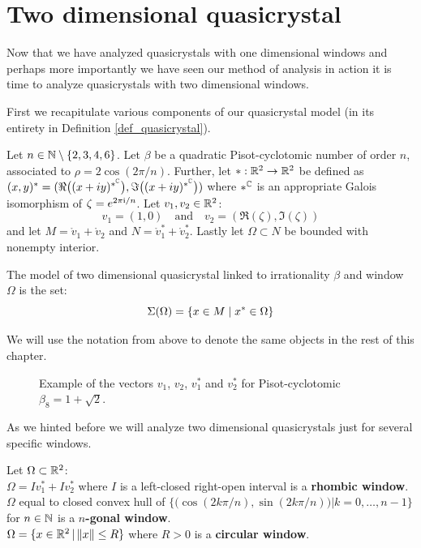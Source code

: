 \documentclass[text.tex]{subfiles}
\begin{document}
\section{Two dimensional quasicrystal}
Now that we have analyzed quasicrystals with one dimensional windows and perhaps more importantly we have seen our method of analysis in action it is time to analyze quasicrystals with two dimensional windows. 

First we recapitulate various components of our quasicrystal model (in its entirety in Definition \ref{def_quasicrystal}). 

Let $n\in\mathbb{N}\setminus\{2,3,4,6\}$. Let $\beta$ be a quadratic Pisot-cyclotomic number of order $n$, associated to $\rho = 2\cos\left(2\pi/n\right)$. Further, let $\ast:\mathbb{R}^2\to\mathbb{R}^2$ be defined as $(x,y)^\ast = (\Re{\big((x+iy)^{\ast^{\mathbb{C}}}\big)}, \Im{\big((x+iy)^{\ast^{\mathbb{C}}}\big)})$ where $\ast^{\mathbb{C}}$ is an appropriate Galois isomorphism of $\zeta = e^{2\pi \mathrm{i}/n}$. 
Let $v_1, v_2\in\mathbb{R}^2$:
$$v_1=(1,0)\quad\text{and}\quad v_2 = (\Re{(\zeta)}, \Im{(\zeta)})$$
and let $M = \ring v_1+\ring v_2$ and $N = \ring v_1^\ast+\ring v_2^\ast$.
Lastly let $\Omega\subset N$ be bounded with nonempty interior. 

The model of two dimensional quasicrystal linked to irrationality $\beta$ and window $\Omega$ is the set:
$$\Sigma(\Omega) = \{ x \in M\; |\; x^\ast\in \Omega\}$$

We will use the notation from above to denote the same objects in the rest of this chapter. 

\begin{figure}[h!]
\centering
{}
\caption{Example of the vectors $v_1$, $v_2$, $v_1^\ast$ and $v_2^\ast$ for Pisot-cyclotomic $\beta_8=1+\sqrt{2}$.}
\end{figure}

As we hinted before we will analyze two dimensional quasicrystals just for several specific windows. 
\begin{definition}
Let $\Omega\subset\mathbb{R}^2$:\\
$\Omega = Iv_1^\ast+Iv_2^\ast$ where $I$ is a left-closed right-open interval is a \textbf{rhombic window}. \\
$\Omega$ equal to closed convex hull of $\big\{\big(\cos(2k\pi/n),\sin(2k\pi/n)\big)\big| k = 0,\dots,n-1 \big\}$ for $n\in\mathbb{N}$ is a \textbf{$n$-gonal window}. \\ 
$\Omega = \{x\in\mathbb{R}^2\,|\,\lVert x \rVert \leq R\}$ where $R>0$ is a \textbf{circular window}.
\end{definition}
\end{document}
